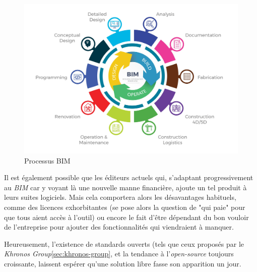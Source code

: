 \begin{figure}[h]
    \centering
    \includegraphics[width=0.6\linewidth]{Figures/bim-process.jpg}
    \caption{Processus BIM}
    \label{fig:bim-process}
\end{figure}

Il est également possible que les éditeurs actuels qui, s'adaptant progressivement au \textit{BIM} car y voyant là une nouvelle manne financière, ajoute un tel produit à leurs suites logiciels. Mais cela comportera alors les désavantages habituels, comme des licences exhorbitantes (se pose alors la question de "qui paie" pour que tous aient accès à l'outil) ou encore le fait d'être dépendant du bon vouloir de l'entreprise pour ajouter des fonctionnalités qui viendraient à manquer.  

Heureusement, l'existence de standards ouverts (tels que ceux proposés par le \textit{Khronos Group}\ref{sec:khronos-group}, et la tendance à l'\textit{open-source} toujours croissante, laissent espérer qu'une solution libre fasse son apparition un jour.